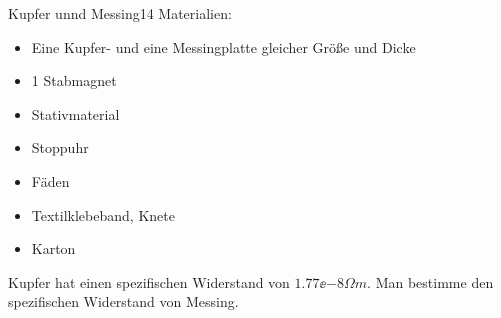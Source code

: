 \begin{problem}{Kupfer unnd Messing}{14}
Materialien:
\begin{itemize}
\item Eine Kupfer- und eine Messingplatte gleicher Größe und Dicke
\item 1 Stabmagnet
\item Stativmaterial
\item Stoppuhr
\item Fäden
\item Textilklebeband, Knete
\item Karton
\end{itemize}
Kupfer hat einen spezifischen Widerstand von $1.77 \ee{-8} \unit{\Omega m}$. Man bestimme den spezifischen Widerstand von Messing.
% 
\end{problem}



